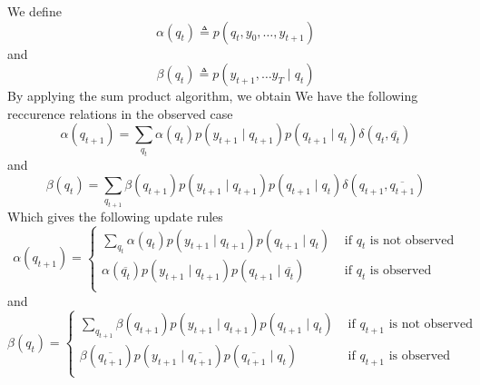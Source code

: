 \documentclass[a4paper, 11pt]{article}
\newcommand{\eqdef}{\triangleq}
\begin{document}
We define
\begin{displaymath}
  \alpha(q_t) \eqdef p(q_{t}, y_0, \dots, y_{t+1})
\end{displaymath}
and
\begin{displaymath}
  \beta(q_{t}) \eqdef p(y_{t+1}, \dots y_T \mid q_t)
\end{displaymath}
By applying the sum product algorithm, we obtain We have the following
reccurence relations in the observed case
\begin{displaymath}
  \alpha(q_{t + 1}) = \sum_{q_t} \alpha(q_t) p(y_{t+1} \mid q_{t+1}) p(q_{t+1} \mid q_t) \delta(q_t, \overline{q_t})
\end{displaymath}
and
\begin{displaymath}
  \beta(q_{t}) = \sum_{q_{t+1}} \beta(q_{t+1}) p(y_{t+1} \mid q_{t+1}) p(q_{t+1} \mid q_t) \delta(q_{t+1}, \overline{q_{t+1}})
\end{displaymath}
Which gives the following update rules
\begin{displaymath}
  \alpha(q_{t + 1}) = \left\{
    \begin{array}{ll}
      \sum_{q_t} \alpha(q_t) p(y_{t+1} \mid q_{t+1}) p(q_{t+1} \mid q_t)
      & \text{ if $q_t$ is not observed} \\[0.5em]
      \alpha(\overline{q_t}) p(y_{t+1} \mid q_{t+1}) p(q_{t+1} \mid \overline{q_t})
      & \text{ if $q_t$ is observed} \\
    \end{array}
  \right.
\end{displaymath}
  and
\begin{displaymath}
  \beta(q_{t}) = \left\{
    \begin{array}{ll}
      \sum_{q_{t+1}} \beta(q_{t+1}) p(y_{t+1} \mid q_{t+1}) p(q_{t+1} \mid q_t)
      & \text{ if $q_{t+1}$ is not observed} \\[0.5em]
      \beta(\overline{q_{t+1}}) p(y_{t+1} \mid \overline{q_{t+1}}) p(\overline{q_{t+1}} \mid q_t)
      & \text{ if $q_{t+1}$ is observed} \\[0.5em]
    \end{array}
    \right.
\end{displaymath}
\end{document}
